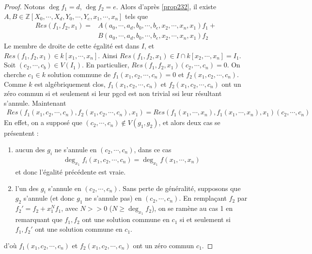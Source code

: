             \begin{proof}
                Notons $\deg f_1 = d$, $\deg f_2 = e$. Alors d'après \ref{prop232}, il existe \linebreak $A,B \in \mathbb{Z}[X_0, \cdots, X_d, Y_0, \cdots, Y_e, x_1, \cdots, x_n]$ tels que
                \begin{align*}
                    Res(f_1, f_2, x_1) = &A(a_0, \cdots, a_d, b_0, \cdots, b_e, x_2, \cdots, x_n, x_1) f_1 + \\
                    &B(a_0, \cdots, a_d, b_0, \cdots, b_e, x_2, \cdots, x_n, x_1) f_2
                \end{align*}
                Le membre de droite de cette égalité est dans $I$, et $Res(f_1, f_2, x_1) \in k[x_1, \cdots, x_n]$. Ainsi $Res(f_1, f_2, x_1) \in I \cap k[x_2, \cdots, x_n] = I_1$. Soit $(c_2, \cdots, c_b) \in V(I_1)$. En particulier, \linebreak $Res(f_1, f_2, x_1)(c_2, \cdots, c_n) = 0$. On cherche $c_1 \in k$ solution commune de $f_1(x_1, c_2, \cdots, c_n) = 0$ et $f_2(x_1, c_2, \cdots, c_n)$. Comme $k$ est algébriquement clos, $f_1(x_1, c_2, \cdots, c_n)$ et $f_2(x_1, c_2, \cdots, c_n)$ ont un zéro commun si et seulement si leur pgcd est non trivial ssi leur résultant s'annule. Maintenant 
                \begin{align*}
                    Res(f_1(x_1, c_2, \cdots, c_n), f_2(x_1, c_2, \cdots, c_n), x_1) = Res(f_1(x_1, \cdots, x_n), f_1(x_1, \cdots, x_n), x_1)(c_2, \cdots, c_n)
                \end{align*}
                En effet, on a supposé que $(c_2, \cdots, c_n) \notin V(g_1, g_2)$, et alors deux cas se présentent : 
                \begin{enumerate}
                    \item aucun des $g_i$ ne s'annule en $(c_2, \cdots, c_n)$, dans ce cas
                    \begin{align*}
                        \deg_{x_1} f_i(x_1, c_2, \cdots, c_n) = \deg_{x_1} f(x_1, \cdots, x_n)
                    \end{align*}
                    et donc l'égalité précédente est vraie.
                    \item l'un des $g_i$ s'annule en $(c_2, \cdots, c_n)$. Sans perte de généralité, supposons que $g_2$ s'annule (et donc $g_1$ ne s'annule pas) en $(c_2, \cdots, c_n)$. En remplaçant $f_2$ par $f_2' = f_2 + x_1^Nf_1$, avec $N >> 0$ ($N \geq \deg_{x_1}f_2$), on se ramène au cas 1 en remarquant que $f_1,f_2$ ont une solution commune en $c_1$ si et seulement si $f_1, f_2'$ ont une solution commune en $c_1$.
                \end{enumerate}
                d'où $f_1(x_1, c_2, \cdots, c_n)$ et $f_2(x_1, c_2, \cdots, c_n)$ ont un zéro commun $c_1$.
            \end{proof}
